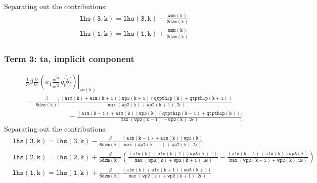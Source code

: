 \documentclass[11pt,fleqn]{article}
\newcommand{\ptlder}[2]{\frac{\partial #1}{\partial #2}}
\begin{document}
Separating out the contributions:
%
\begin{equation}
\begin{split}
& \mathtt{ lhs(3,k) = lhs(3,k) - \frac{wmm(k)}{2 dzm(k)} } \\
& \mathtt{ lhs(1,k) = lhs(1,k) + \frac{wmm(k)}{2 dzm(k)} }
\end{split}
\end{equation}

\subsubsection{Term 3:  ta, implicit component}

\begin{equation}
\begin{split}
& \left.
  \frac{1}{3} \beta
   \ptlder{}{z}
     \left( 
       a_1
       \frac{\overline{w^{'3}}}{\overline{w^{'2}}} \,
       \overline{q_t^{'}\theta_l^{'}}
     \right)
   \right|_{\mathtt{zm(k)}} \\
&= \mathtt{
    \frac{\beta}{6 dzm(k)}
    \bigg[ \frac{\left(a1m(k)+a1m(k+1)\right) wp3(k+1) \left(qtpthlp(k)+qtpthlp(k+1) \right)}
                {\max\left(wp2(k)+wp2(k+1),2\epsilon\right)} } \\
&  \mathtt{ \quad \quad \quad \quad \quad \quad
          -\frac{\left(a1m(k-1)+a1m(k)\right) wp3(k) \left(qtpthlp(k-1)+qtpthlp(k) \right)}
                {\max\left(wp2(k-1)+wp2(k),2\epsilon\right)}
    \bigg]
    }
\end{split}
\end{equation}
%
Separating out the contributions:
%
\begin{equation}
\begin{split}
& \mathtt{ 
   lhs(3,k) = lhs(3,k) - \frac{\beta}{6 dzm(k)}
                 \frac{\left(a1m(k-1)+a1m(k)\right) wp3(k)}
                      {\max\left(wp2(k-1)+wp2(k),2\epsilon\right)}
  } \\
& \mathtt{
   lhs(2,k) = lhs(2,k) + \frac{\beta}{6 dzm(k)}
                 \left(
                   \frac{\left(a1m(k)+a1m(k+1)\right) wp3(k+1)}
                        {\max\left(wp2(k)+wp2(k+1),2\epsilon\right)}
                  -\frac{\left(a1m(k-1)+a1m(k)\right) wp3(k)}
                        {\max\left(wp2(k-1)+wp2(k),2\epsilon\right)}
                 \right)
  } \\
& \mathtt{
   lhs(1,k) = lhs(1,k) + \frac{\beta}{6 dzm(k)}
                 \frac{\left(a1m(k)+a1m(k+1)\right) wp3(k+1)}
                      {\max\left(wp2(k)+wp2(k+1),2\epsilon\right)}
  }
\end{split}
\end{equation}
\end{document}
